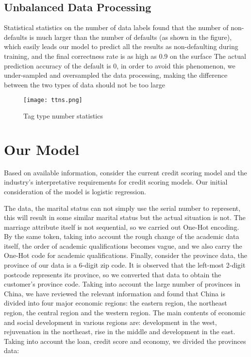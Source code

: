 \documentclass{mcmthesis}
\begin{document}
\subsection{Unbalanced Data Processing}
Statistical statistics on the number of data labels found that the number of non-defaults is much larger than the number of defaults (as shown in the figure), which easily leads our model to predict all the results as non-defaulting during training, and the final correctness rate is as high as 0.9 on the surface The actual prediction accuracy of the default is 0, in order to avoid this phenomenon, we under-sampled and oversampled the data processing, making the difference between the two types of data should not be too large
\newline
\begin{figure}[h]
\small
\centering
\texttt{[image: ttns.png]}
\caption{Tag type number statistics} \label{fig:Tag type number statistics}
\end{figure}

\section{Our Model}
Based on available information, consider the current credit scoring model and the industry's interpretative requirements for credit scoring models. Our initial consideration of the model is logistic regression.

The data, the marital status can not simply use the serial number to represent, this will result in some similar marital status but the actual situation is not. The marriage attribute itself is not sequential, so we carried out One-Hot encoding. By the same token, taking into account the rough change of the academic data itself, the order of academic qualifications becomes vague, and we also carry the One-Hot code for academic qualifications. Finally, consider the province data, the province of our data is a 6-digit zip code. It is observed that the left-most 2-digit postcode represents its province, so we converted that data to obtain the customer's province code. Taking into account the large number of provinces in China, we have reviewed the relevant information and found that China is divided into four major economic regions: the eastern region, the northeast region, the central region and the western region. The main contents of economic and social development in various regions are: development in the west, rejuvenation in the northeast, rise in the middle and development in the east. Taking into account the loan, credit score and economy, we divided the provinces data:
\end{document}
